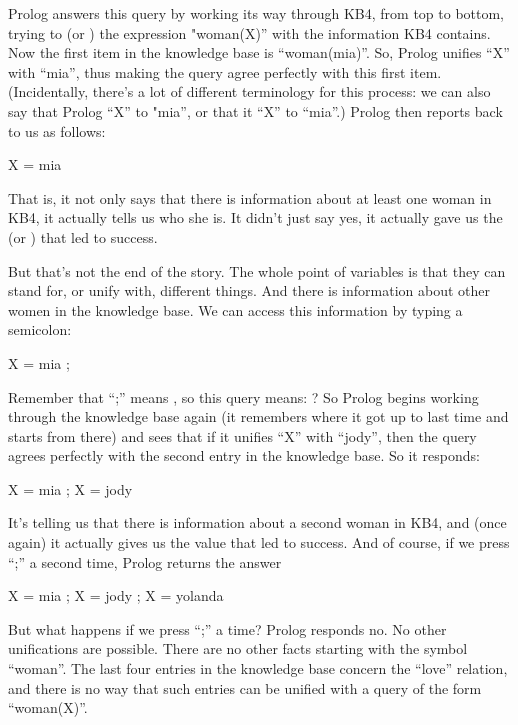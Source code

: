 \pagebreak   %
Prolog answers this query by working its way through KB4, from top to
bottom, trying to  (or ) the expression
"woman(X)'' with the information KB4 contains. Now the first item in
the knowledge base is ``woman(mia)''. So, Prolog unifies ``X'' with ``mia'',
thus making the query agree perfectly with this first item.
(Incidentally, there's a lot of different terminology for this
process: we can also say that Prolog  ``X'' to
"mia'', or that it  ``X'' to ``mia''.)  Prolog then reports
back to us as follows:
\begin{LPNcodedisplay}
X = mia
\end{LPNcodedisplay}
That is, it not only says that there is information about at least one
woman in KB4, it actually tells us who she is. It didn't just say yes,
it actually gave us the  (or ) that led to success.

But that's not the end of the story. The whole point of variables
is that they can stand for,  or
unify with,  different things. And there is information about other
women in the knowledge base. We can access this information by typing
a semicolon:
\begin{LPNcodedisplay}
X = mia ;
\end{LPNcodedisplay}
Remember that ``;'' means , so this query means:
?  So Prolog begins working through
the knowledge base again (it remembers where it got up to last time
and starts from there) and sees that if it unifies ``X'' with ``jody'',
then the query agrees perfectly with the second entry in the knowledge
base.  So it responds:
\begin{LPNcodedisplay}
X = mia ;
X = jody
\end{LPNcodedisplay}
It's telling us that there is information about a second woman in KB4,
and (once again) it actually gives us the value that led to success.
And of course, if we press ``;'' a second time, Prolog returns the
answer
\begin{LPNcodedisplay}
X = mia ;
X = jody ;
X = yolanda
\end{LPNcodedisplay}


But what happens if we press ``;'' a  time?  Prolog responds
no. No other unifications are possible.  There are no other facts starting
with the symbol ``woman''.  The last four entries in the knowledge base concern
the ``love'' relation, and there is no way that such entries can be unified with
a query of the form ``woman(X)''.

